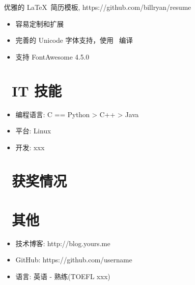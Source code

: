 \documentclass{resume}
\begin{document}
\begin{onehalfspacing}
优雅的 \LaTeX\ 简历模板, https://github.com/billryan/resume
\begin{itemize}
  \item 容易定制和扩展
  \item 完善的 Unicode 字体支持，使用 \XeLaTeX\ 编译
  \item 支持 FontAwesome 4.5.0
\end{itemize}
\end{onehalfspacing}


\section{\faCogs\ IT 技能}
\begin{itemize}[parsep=0.5ex]
  \item 编程语言: C == Python > C++ > Java
  \item 平台: Linux
  \item 开发: xxx
\end{itemize}

\section{\faHeartO\ 获奖情况}

\section{\faInfo\ 其他}
\begin{itemize}[parsep=0.5ex]
  \item 技术博客: http://blog.yours.me
  \item GitHub: https://github.com/username
  \item 语言: 英语 - 熟练(TOEFL xxx)
\end{itemize}

%
%
\end{document}
